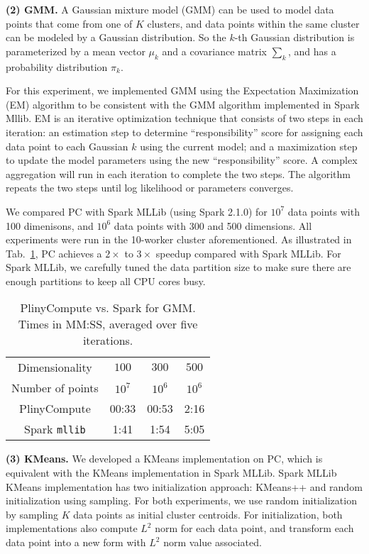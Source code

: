 \vspace{5pt}
\noindent
\textbf {(2) GMM.} A Gaussian mixture model (GMM) can be used to model data points that come
from one of $K$ clusters, and data points within the same cluster
can be modeled by a Gaussian distribution. So the $k$-th Gaussian
distribution is parameterized by a mean vector $\mu_k$ and a covariance
matrix $\sum_k$, and has a probability distribution $\pi_k$.

For this experiment, we
implemented GMM using the Expectation Maximization (EM) algorithm to be
consistent with the GMM algorithm implemented in Spark Mllib. EM is an
iterative optimization technique that consists of two steps in each
iteration: an estimation step to determine ``responsibility'' score
for assigning each data point to each Gaussian $k$ using the current model; and a maximization step to
update the model parameters using the new ``responsibility'' score. A complex
aggregation will run in each iteration to complete the two steps. The algorithm repeats
the two steps until log likelihood or parameters converges. 

We compared PC with Spark MLLib (using Spark 2.1.0) for $10^7$ data
points with 100 dimenisons, and $10^6$ data points with 300 and 500
dimensions. All experiments were run in the 10-worker cluster aforementioned. 
As illustrated in Tab.~\ref{fig:Gmm}, PC achieves a $2\times$ to
$3\times$ speedup compared with Spark MLLib. For Spark MLLib, we
carefully tuned the data partition size to make sure there are enough
partitions to keep all CPU cores busy.

\begin{table}[h!]
\begin{center}
\begin{tabular}{|c||c|c|c||}
\hline
Dimensionality & $100$ & $300$ & $500$ \\
Number of points & $10^7$ & $10^6$ & $10^6$ \\
\hline
\hline
PlinyCompute &00:33 & 00:53 & 2:16 \\
Spark \texttt{mllib} &1:41  &1:54 &5:05 \\
\hline
\end{tabular}
\caption{PlinyCompute vs. Spark for GMM. Times in MM:SS, averaged over five iterations.}
\label{fig:Gmm}
\end{center}
\end{table}
\vspace{-10pt}


\vspace{5pt}
\noindent
\textbf {(3) KMeans.} We developed a KMeans implementation on PC, which
is equivalent with the KMeans implementation in Spark MLLib. Spark
MLLib KMeans implementation has two initialization approach: KMeans++
and random initialization using sampling. For both experiments, we use
random initialization by sampling $K$ data points as initial
cluster centroids. For initialization, both implementations also compute $L^2$ norm for each data
point, and transform each data point into a new form with $L^2$ norm value
associated. 

